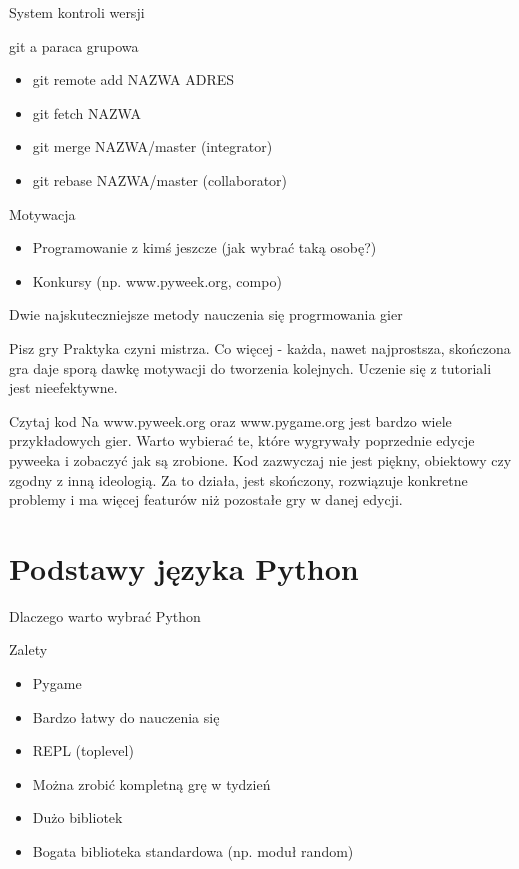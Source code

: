 \documentclass{beamer}
\begin{document}
\begin{frame}{System kontroli wersji}
  \begin{block}{git a paraca grupowa}
    \begin{itemize}
    \item git remote add NAZWA ADRES
    \item git fetch NAZWA
    \item git merge NAZWA/master  (integrator)
    \item git rebase NAZWA/master (collaborator)
    \end{itemize}
  \end{block}
\end{frame}

\begin{frame}{Motywacja}
  \begin{itemize}
  \item Programowanie z kimś jeszcze (jak wybrać taką osobę?)
  \item Konkursy (np. www.pyweek.org, compo)
  \end{itemize}
\end{frame}

\begin{frame}{Dwie najskuteczniejsze metody nauczenia się progrmowania gier}

  \begin{block}{Pisz gry}
    Praktyka czyni mistrza. Co więcej - każda, nawet najprostsza,
    skończona gra daje sporą dawkę motywacji do tworzenia
    kolejnych. Uczenie się z tutoriali jest nieefektywne.
  \end{block}

  \begin{block}{Czytaj kod}
    Na www.pyweek.org oraz www.pygame.org jest bardzo wiele
    przykładowych gier. Warto wybierać te, które wygrywały poprzednie
    edycje pyweeka i zobaczyć jak są zrobione. Kod zazwyczaj nie jest
    piękny, obiektowy czy zgodny z inną ideologią. Za to działa, jest
    skończony, rozwiązuje konkretne problemy i ma więcej featurów niż
    pozostałe gry w danej edycji.
  \end{block}

\end{frame}


\section{Podstawy języka Python}
\begin{frame}{Dlaczego warto wybrać Python}
  \begin{block}{Zalety}
    \begin{itemize}
    \item Pygame
    \item Bardzo łatwy do nauczenia się
    \item REPL (toplevel)
    \item Można zrobić kompletną grę w tydzień
    \item Dużo bibliotek
    \item Bogata biblioteka standardowa (np. moduł random)
    \end{itemize}
  \end{block}
\end{frame}
\end{document}
